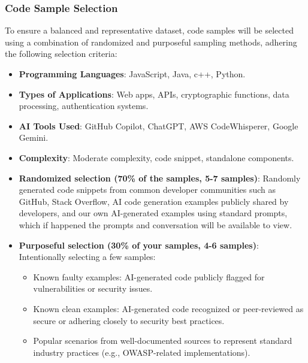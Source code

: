 \subsubsection{Code Sample Selection}
To ensure a balanced and representative dataset, code samples will be selected using a combination of randomized and purposeful sampling methods, adhering the following selection criteria:

\begin{itemize}
    \item \textbf{Programming Languages}: JavaScript, Java, c++, Python.
    \item \textbf{Types of Applications}: Web apps, APIs, cryptographic functions, data processing, authentication systems.
    \item \textbf{AI Tools Used}: GitHub Copilot, ChatGPT, AWS CodeWhisperer, Google Gemini.
    \item \textbf{Complexity}: Moderate complexity, code snippet, standalone components.
    \item \textbf{Randomized selection  (70\% of the samples, 5-7 samples)}: Randomly generated code snippets from common developer communities such as GitHub, Stack Overflow, AI code generation examples publicly shared by developers, and our own AI-generated examples using standard prompts, which if happened the prompts and conversation will be available to view.
    \item \textbf{Purposeful selection (30\% of your samples, 4-6 samples)}: Intentionally selecting a few samples:
    \begin{itemize}
        \item Known faulty examples: AI-generated code publicly flagged for vulnerabilities or security issues.
        \item Known clean examples: AI-generated code recognized or peer-reviewed as secure or adhering closely to security best practices.
        \item Popular scenarios from well-documented sources to represent standard industry practices (e.g., OWASP-related implementations).
    \end{itemize}
\end{itemize}

